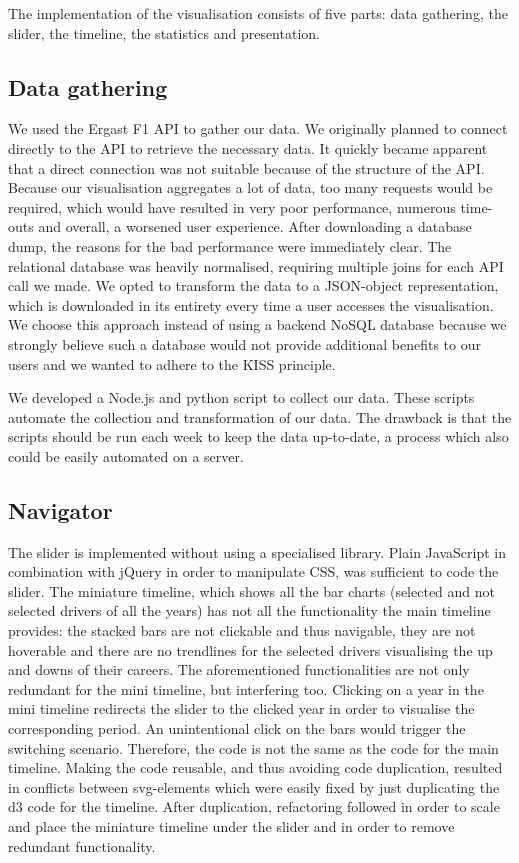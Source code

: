 \documentclass{sigchi}
\begin{document}
The implementation of the visualisation consists of five parts: data gathering, the slider, the timeline, the statistics and presentation.

\subsection{Data gathering} %

We used the Ergast F1 API to gather our data. We originally planned to connect directly to the API to retrieve the necessary data. It quickly became apparent that a direct connection was not suitable because of the structure of the API. Because our visualisation aggregates a lot of data, too many requests would be required, which would have resulted in very poor performance, numerous time-outs and overall, a worsened user experience. After downloading a database dump, the reasons for the bad performance were immediately clear. The relational database was heavily normalised, requiring multiple joins for each API call we made. We opted to transform the data to a JSON-object representation, which is downloaded in its entirety every time a user accesses the visualisation. We choose this approach instead of using a backend NoSQL database because we strongly believe such a database would not provide additional benefits to our users and we wanted to adhere to the KISS principle.

We developed a Node.js and python script to collect our data. These scripts automate the collection and transformation of our data. The drawback is that the scripts should be run each week to keep the data up-to-date, a process which also could be easily automated on a server.
\label{sub:data_gathering}

\subsection{Navigator} %
\label{sub:navigator}

The slider is implemented without using a specialised library. Plain JavaScript in combination with jQuery in order to manipulate CSS, was sufficient to code the slider. The miniature timeline, which shows all the bar charts (selected and not selected drivers of all the years)  has not all the functionality the main timeline provides: the stacked bars are not clickable and thus navigable, they are not hoverable and there are no trendlines for the selected drivers visualising the up and downs of their careers. The aforementioned functionalities are not only redundant for the mini timeline, but interfering too. Clicking on a year in the mini timeline redirects the slider to the clicked year in order to visualise the corresponding period. An unintentional click on the bars would trigger the switching scenario. Therefore, the code is not the same as the code for the main timeline. Making the code reusable, and thus avoiding code duplication, resulted in conflicts between svg-elements which were easily fixed by just duplicating the d3 code for the timeline. After duplication, refactoring followed in order to scale and place the miniature timeline under the slider and in order to remove redundant functionality. 
\end{document}
